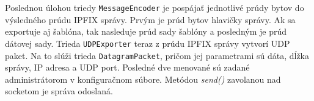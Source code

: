 Poslednou úlohou triedy \verb|MessageEncoder| je pospájať jednotlivé prúdy bytov do výsledného prúdu IPFIX 
správy. Prvým je prúd bytov hlavičky správy. Ak sa exportuje aj šablóna, tak nasleduje prúd sady šablóny 
a posledným je prúd dátovej sady. Trieda \verb|UDPExporter| teraz z prúdu IPFIX správy vytvorí 
UDP paket. Na to slúži trieda \verb|DatagramPacket|, pričom jej parametrami sú dáta, dĺžka správy, 
IP adresa a UDP port. Posledné dve menované sú zadané administrátorom v konfiguračnom súbore. Metódou 
\emph{send()} zavolanou nad socketom je správa odoslaná.







